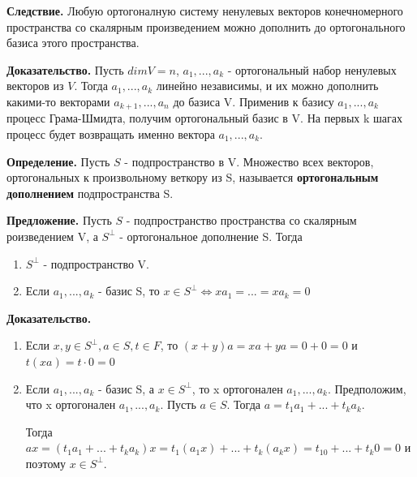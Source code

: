\documentclass[a4paper]{article}
\begin{document}
    \begin{htheorem}
        \textbf{Следствие.} Любую ортогоналную систему ненулевых векторов конечномерного пространства со скалярным произведением можно дополнить до ортогонального базиса этого пространства.
    \end{htheorem}

    \begin{hproof}
        \textbf{Доказательство.} Пусть $dimV = n$, $a_1, ..., a_k$ - ортогональный набор ненулевых векторов из $V$. Тогда $a_1, ..., a_k$ линейно независимы, и их можно дополнить какими-то векторами $a_{k+1}, ..., a_n$ до базиса V. Применив к базису $a_1, ..., a_k$ процесс Грама-Шмидта, получим ортогональный базис в V. На первых k шагах процесс будет возвращать именно вектора $a_1, ..., a_k$.
    \end{hproof}

    \textbf{Определение.} Пусть $S$ - подпространство в V. Множество всех векторов, ортогональных к произвольному веткору из S, называется \textbf{ортогональным дополнением} подпространства S.

    \begin{htheorem}
        \textbf{Предложение.} Пусть $S$ - подпространство пространства со скалярным роизведением V, а $S^{\bot}$ - ортогональное дополнение S. Тогда
        \begin{enumerate}
            \item $S^{\bot}$ - подпространство V.
            \item Если $a_1, ..., a_k$ - базис S, то  $x \in S^{\bot} \Leftrightarrow xa_1 = ... = xa_k = 0$
        \end{enumerate}
    \end{htheorem}

    \begin{hproof}
        \textbf{Доказательство.}

        \begin{enumerate}
            \item Если $x, y \in S^{\bot}, a \in S, t \in F$, то $(x+y)a = xa+ya = 0+0=0$ и $t(xa) = t \cdot 0 = 0$

            \item Если $a_1, ..., a_k$ - базис S, а $x \in S^{\bot}$, то x ортогонален $a_1, ..., a_k$. Предположим, что x ортогонален $a_1, ..., a_k$. Пусть $a \in S$. Тогда $a = t_1a_1 + ... +t_ka_k$.

            Тогда $ax = (t_1a_1 + ... + t_ka_k)x = t_1(a_1x) + ... + t_k(a_kx) = t_10 + ... + t_k0 = 0$ и поэтому $x \in S^{\bot}$.
        \end{enumerate}
    \end{hproof}
\end{document}
